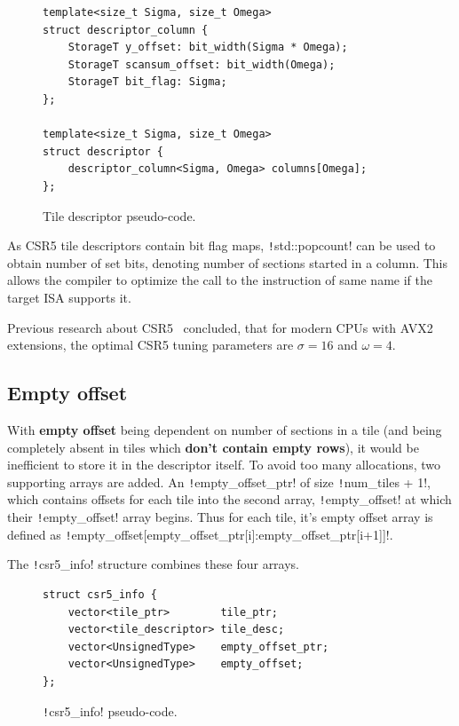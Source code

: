 \documentclass[thesis=M,english]{FITthesis}[2019/12/23]
\newcommand{\csre}[1]{\texttt!#1!}
\begin{document}
\begin{figure}[htp]

    \begin{verbatim}
template<size_t Sigma, size_t Omega>
struct descriptor_column {
    StorageT y_offset: bit_width(Sigma * Omega);
    StorageT scansum_offset: bit_width(Omega);
    StorageT bit_flag: Sigma;
};

template<size_t Sigma, size_t Omega>
struct descriptor {
    descriptor_column<Sigma, Omega> columns[Omega];
};
    \end{verbatim}
    \caption{Tile descriptor pseudo-code.}\label{csr5:tileDesc}
\end{figure}

As CSR5 tile descriptors contain bit flag maps, \csre{std::popcount} can be used to obtain number of set bits,
denoting number of sections started in a column.
This allows the compiler to optimize the call to the instruction of same name if the target ISA supports it.

Previous research about CSR5~\cite{liu2015csr5} concluded, that for modern CPUs with AVX2 extensions, the optimal CSR5 tuning parameters
are \(\sigma = 16\) and \(\omega = 4\).


\subsection{Empty offset}

With \textbf{empty offset} being dependent on number of sections in a tile (and being completely absent
in tiles which \textbf{don't contain empty rows}), it would be inefficient to
store it in the descriptor itself. To avoid too many allocations, two supporting arrays are added.
An \csre{empty_offset_ptr} of size \csre{num_tiles + 1}, which contains offsets for each tile into the
second array, \csre{empty_offset} at which their \csre{empty_offset} array begins.
Thus for each tile, it's empty offset array is defined as
\csre{empty_offset[empty_offset_ptr[i]:empty_offset_ptr[i+1]]}.

The \csre{csr5_info} structure combines these four arrays.


\begin{figure}[htp]
    \begin{verbatim}
struct csr5_info {
    vector<tile_ptr>        tile_ptr;
    vector<tile_descriptor> tile_desc;
    vector<UnsignedType>    empty_offset_ptr;
    vector<UnsignedType>    empty_offset;
};
    \end{verbatim}
    \caption{\csre{csr5_info} pseudo-code.}
\end{figure}
\end{document}

